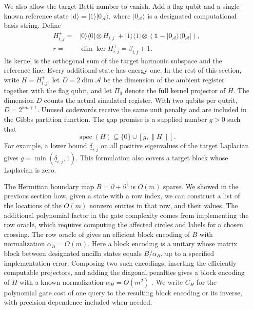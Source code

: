 \documentclass[a4paper,onecolumn,unpublished]{quantumarticle}
\theoremstyle{plain}
\theoremstyle{definition}
\theoremstyle{definition}
\numberwithin{equation}{section}
\begin{document}
We also allow the target Betti number to vanish. Add a flag qubit and a
single known reference state $|\mathrm d\rangle=|1\rangle|0_{\mathcal A}\rangle$,
where $|0_{\mathcal A}\rangle$ is a designated computational basis string.
Define
\begin{equation}\label{eq:dummy-mode}
\begin{split}
 H^+_{i,j}={}&|0\rangle\!\langle0|\otimes H_{i,j}\;+
 |1\rangle\!\langle1|\otimes
 (\mathbb 1-|0_{\mathcal A}\rangle\!\langle0_{\mathcal A}|),\\
 r={}&\dim\ker H^+_{i,j}=\beta_{i,j}+1.
\end{split}
\end{equation}
Its kernel is the orthogonal sum of the target harmonic subspace and
the reference line. Every additional state has energy one. In the rest
of this section, write $H=H^+_{i,j}$, let $D=2\dim\mathcal A$ be the dimension of the ambient register together with the flag qubit, and let
$\Pi_0$ denote the full kernel projector of $H$. The dimension $D$
counts the actual simulated register. With two qubits per qutrit,
$D=2^{5m+1}$. Unused codewords receive the same unit penalty and
are included in the Gibbs partition function. The gap promise
is a supplied number $g>0$ such that
\begin{equation}\label{eq:target-gap-promise}
 \operatorname{spec}(H)\subseteq\{0\}\cup[g,\|H\|].
\end{equation}
For example, a lower bound $\underline\delta_{i,j}$ on all positive
eigenvalues of the target Laplacian gives $g=\min(\underline\delta_{i,j},1)$.
This formulation also covers a target block whose Laplacian is zero.

The Hermitian boundary map $B=\partial+\partial^\dagger$ is $O(m)$ sparse.
We showed in the previous section how, given a state with a row index,
we can construct a list of the locations of the $O(m)$ nonzero entries
in that row, and their values. The additional polynomial factor in the
gate complexity comes from implementing the row oracle, which requires
computing the affected circles and labels for a chosen crossing.
The row oracle of  gives an efficient block encoding
of $B$ with normalization $\alpha_B=O(m)$. Here a block encoding is a
unitary whose matrix block between designated ancilla states equals
$B/\alpha_B$, up to a specified implementation error. Composing two
such encodings, inserting the efficiently computable projectors, and
adding the diagonal penalties gives a block encoding of $H$ with a
known normalization $\alpha_H=O(m^2)$
\cite{GilyenSuLowWiebe2019}. We write $C_H$ for the
polynomial gate cost of one query to the resulting block encoding or
its inverse, with precision dependence included when needed.
\end{document}
